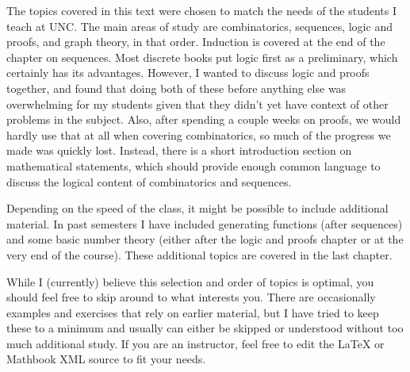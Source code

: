 \documentclass[10pt,]{book}
\theoremstyle{plain}
\theoremstyle{definition}
\theoremstyle{definition}
\theoremstyle{definition}
\theoremstyle{definition}
\numberwithin{equation}{chapter}
\begin{document}
The topics covered in this text were chosen to match the needs of the students I teach at UNC. The main areas of study are combinatorics, sequences, logic and proofs, and graph theory, in that order. Induction is covered at the end of the chapter on sequences. Most discrete books put logic first as a preliminary, which certainly has its advantages. However, I wanted to discuss logic and proofs together, and found that doing both of these before anything else was overwhelming for my students given that they didn't yet have context of other problems in the subject. Also, after spending a couple weeks on proofs, we would hardly use that at all when covering combinatorics, so much of the progress we made was quickly lost.  Instead, there is a short introduction section on mathematical statements, which should provide enough common language to discuss the logical content of combinatorics and sequences.%
\par
\hypertarget{p-4}{}%
Depending on the speed of the class, it might be possible to include additional material. In past semesters I have included generating functions (after sequences) and some basic number theory (either after the logic and proofs chapter or at the very end of the course). These additional topics are covered in the last chapter.%
\par
\hypertarget{p-5}{}%
While I (currently) believe this selection and order of topics is optimal, you should feel free to skip around to what interests you. There are occasionally examples and exercises that rely on earlier material, but I have tried to keep these to a minimum and usually can either be skipped or understood without too much additional study. If you are an instructor, feel free to edit the \LaTeX{} or Mathbook XML source to fit your needs.%
\typeout{************************************************}
\typeout{************************************************}
\end{document}
